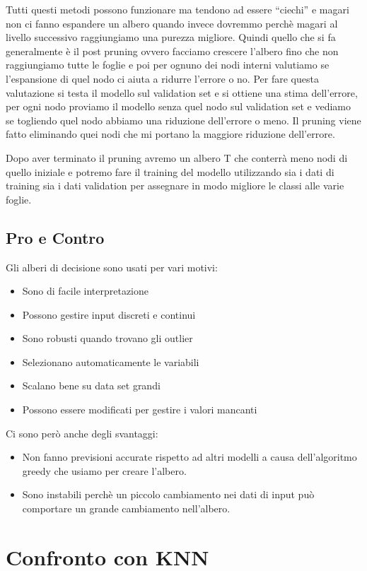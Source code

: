 \documentclass[14pt]{extreport}
\begin{document}
Tutti questi metodi possono funzionare ma tendono ad essere “ciechi” e magari non ci fanno espandere un albero quando invece dovremmo perchè magari al
livello successivo raggiungiamo una purezza migliore. Quindi quello che si fa generalmente è il post pruning ovvero facciamo crescere l’albero fino
che non raggiungiamo tutte le foglie e poi per ognuno dei nodi interni valutiamo se l’espansione di quel nodo ci aiuta a ridurre l’errore o no. Per
fare questa valutazione si testa il modello sul validation set e si ottiene una stima dell’errore, per ogni nodo proviamo il modello senza quel nodo
sul validation set e vediamo se togliendo quel nodo abbiamo una riduzione dell’errore o meno. Il pruning viene fatto eliminando quei nodi che mi
portano la maggiore riduzione dell’errore.

Dopo aver terminato il pruning avremo un albero T che conterrà meno nodi di quello iniziale e potremo fare il training del modello utilizzando sia i
dati di training sia i dati validation per assegnare in modo migliore le classi alle varie foglie.

\subsection{Pro e Contro}

Gli alberi di decisione sono usati per vari motivi:
\begin{itemize}
	\item Sono di facile interpretazione
	\item Possono gestire input discreti e continui
	\item Sono robusti quando trovano gli outlier
	\item Selezionano automaticamente le variabili
	\item Scalano bene su data set grandi
	\item Possono essere modificati per gestire i valori mancanti
\end{itemize}


Ci sono però anche degli svantaggi:
\begin{itemize}
	\item Non fanno previsioni accurate rispetto ad altri modelli a causa dell’algoritmo greedy che usiamo per creare l’albero.
	\item Sono instabili perchè un piccolo cambiamento nei dati di input può comportare un grande cambiamento nell’albero.
\end{itemize}


\section{Confronto con KNN}
\end{document}
